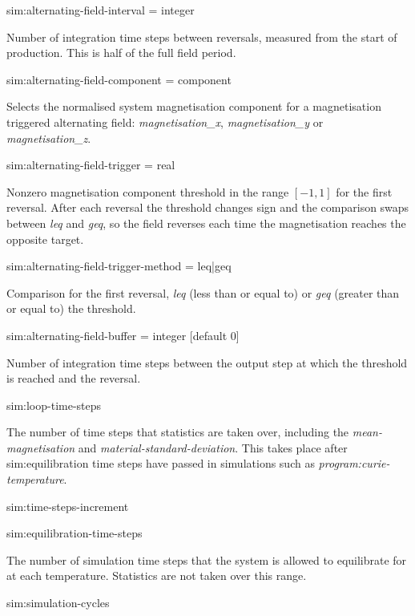 {\zicf sim:alternating-field-interval = integer}
Number of integration time steps between reversals, measured from the start of production. This is half of the full field period.

{\zicf sim:alternating-field-component = component}
Selects the normalised system magnetisation component for a magnetisation triggered alternating field: \textit{magnetisation\_x}, \textit{magnetisation\_y} or \textit{magnetisation\_z}.

{\zicf sim:alternating-field-trigger = real}
Nonzero magnetisation component threshold in the range $[-1,1]$ for the first reversal. After each reversal the threshold changes sign and the comparison swaps between \textit{leq} and \textit{geq}, so the field reverses each time the magnetisation reaches the opposite target.

{\zicf sim:alternating-field-trigger-method = leq|geq}
Comparison for the first reversal, \textit{leq} (less than or equal to) or \textit{geq} (greater than or equal to) the threshold.

{\zicf sim:alternating-field-buffer = integer [default 0]}
Number of integration time steps between the output step at which the threshold is reached and the reversal.

{\zicf sim:loop-time-steps} The number of time steps that statistics are taken over, including the \textit{mean-magnetisation} and \textit{material-standard-deviation}. This takes place after sim:equilibration time steps have passed in simulations such as \textit{program:curie-temperature}.

{\zicf sim:time-steps-increment}

{\zicf sim:equilibration-time-steps} The number of simulation time steps that the system is allowed to equilibrate for at each temperature. Statistics are not taken over this range.

{\zicf sim:simulation-cycles}

